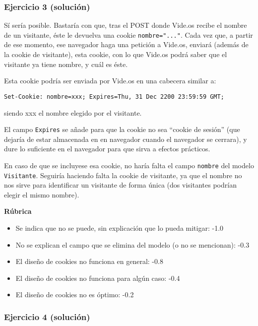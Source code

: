 \subsubsection{Ejercicio 3 (solución)}

Sí sería posible. Bastaría con que, tras el POST donde Vide.os recibe el nombre de un visitante, éste le devuelva una cookie \texttt{nombre="..."}. Cada vez que, a partir de ese momento, ese navegador haga una petición a Vide.os, enviará (además de la cookie de visitante), esta cookie, con lo que Vide.os podrá saber que el visitante ya tiene nombre, y cuál es éste.

Esta cookie podría ser enviada por Vide.os en una cabecera similar a:

\begin{verbatim}
Set-Cookie: nombre=xxx; Expires=Thu, 31 Dec 2200 23:59:59 GMT;
\end{verbatim}

siendo xxx el nombre elegido por el visitante.

El campo \texttt{Expires} se añade para que la cookie no sea ``cookie de sesión'' (que dejaría de estar almacenada en en navegador cuando el navegador se cerrara), y dure lo suficiente en el navegador para que sirva a efectos prácticos.

En caso de que se incluyese esa cookie, no haría falta el campo \texttt{nombre} del modelo \texttt{Visitante}. Seguiría haciendo falta la cookie de visitante, ya que el nombre no nos sirve para identificar un visitante de forma única (dos visitantes podrían elegir el mismo nombre).

\vspace{.4cm}\textbf{Rúbrica}

\begin{itemize}
\item Se indica que no se puede, sin explicación que lo pueda mitigar: -1.0
\item No se explican el campo que se elimina del modelo (o no se mencionan): -0.3
\item El diseño de cookies no funciona en general: -0.8
\item El diseño de cookies no funciona para algún caso: -0.4
\item El diseño de cookies no es óptimo: -0.2
\end{itemize}

\subsubsection{Ejercicio 4 (solución)}

